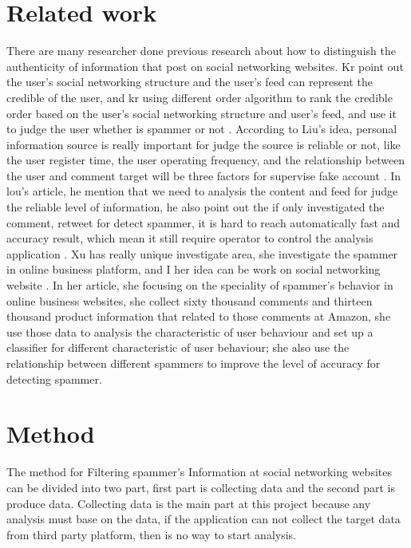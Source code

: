 \documentclass[sigconf]{acmart}
\begin{document}
\section{Related work}
There are many researcher done previous research about how to distinguish the authenticity of information that post on social networking websites. Kr point out the user's social networking structure and the user's feed can represent the credible of the user, and kr using different order algorithm to rank the credible order based on the user's social networking structure and user's feed, and use it to judge the user whether is spammer or not \cite{relatd:01}. According to Liu's idea, personal information source is really important for judge the source is reliable or not, like the user register time, the user operating frequency, and the relationship between the user and comment target will be three factors for supervise fake account \cite{relatd:02}. In lou's article, he mention that we need to analysis the content and feed for judge the reliable level of information, he also point out the if only investigated the comment, retweet for detect spammer, it is hard to reach automatically fast and accuracy result, which mean it still require operator to control the analysis application \cite{relatd:03}. Xu has really unique investigate area, she investigate the spammer in online business platform, and I her idea can be work on social networking website \cite{relatd:04}. In her article, she focusing on the speciality of spammer's behavior in online business websites, she collect sixty thousand comments and thirteen thousand product information that related to those comments at Amazon, she use those data to analysis the characteristic of user behaviour and set up a classifier for different characteristic of user behaviour; she also use the relationship between different spammers to improve the level of accuracy for detecting spammer. 

\section{Method}
The method for Filtering spammer's Information at social networking websites can be divided into two part, first part is collecting data and the second part is produce data. Collecting data is the main part at this project because any analysis must base on the data, if the application can not collect the target data from third party platform, then is no way to start analysis. 
\end{document}
